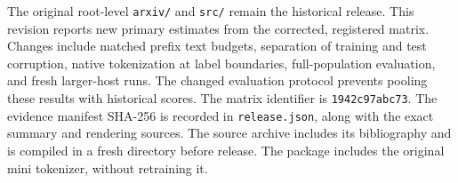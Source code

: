 The original root-level \texttt{arxiv/} and \texttt{src/} remain the historical release. This revision reports new primary estimates from the corrected, registered matrix. Changes include matched prefix text budgets, separation of training and test corruption, native tokenization at label boundaries, full-population evaluation, and fresh larger-host runs. The changed evaluation protocol prevents pooling these results with historical scores. The matrix identifier is \texttt{1942c97abc73}. The evidence manifest SHA-256 is recorded in \texttt{release.json}, along with the exact summary and rendering sources. The source archive includes its bibliography and is compiled in a fresh directory before release. The package includes the original mini tokenizer, without retraining it.
